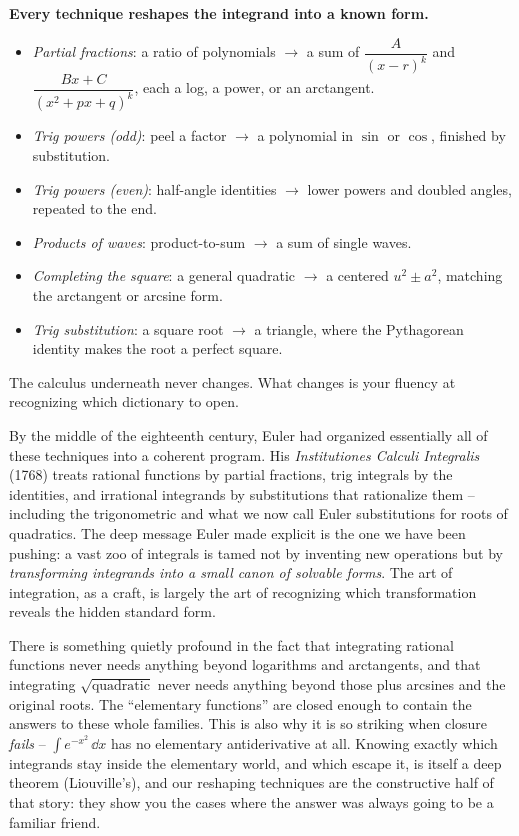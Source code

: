 \begin{focusbox}
\textbf{Every technique reshapes the integrand into a known form.}
\begin{itemize}
\item \emph{Partial fractions}: a ratio of polynomials $\to$ a sum of
   $\dfrac{A}{(x-r)^k}$ and $\dfrac{Bx+C}{(x^2+px+q)^k}$, each a log, a power,
   or an arctangent.
\item \emph{Trig powers (odd)}: peel a factor $\to$ a polynomial in $\sin$ or
   $\cos$, finished by substitution.
\item \emph{Trig powers (even)}: half-angle identities $\to$ lower powers and
   doubled angles, repeated to the end.
\item \emph{Products of waves}: product-to-sum $\to$ a sum of single waves.
\item \emph{Completing the square}: a general quadratic $\to$ a centered
   $u^2 \pm a^2$, matching the arctangent or arcsine form.
\item \emph{Trig substitution}: a square root $\to$ a triangle, where the
   Pythagorean identity makes the root a perfect square.
\end{itemize}
The calculus underneath never changes. What changes is your fluency at
recognizing which dictionary to open.
\end{focusbox}

\begin{historybox}
By the middle of the eighteenth century, Euler had organized essentially all of
these techniques into a coherent program. His \emph{Institutiones Calculi
Integralis} (1768) treats rational functions by partial fractions, trig
integrals by the identities, and irrational integrands by substitutions that
rationalize them -- including the trigonometric and what we now call Euler
substitutions for roots of quadratics. The deep message Euler made explicit is
the one we have been pushing: a vast zoo of integrals is tamed not by inventing
new operations but by \emph{transforming integrands into a small canon of
solvable forms}. The art of integration, as a craft, is largely the art of
recognizing which transformation reveals the hidden standard form.
\end{historybox}

\begin{aestheticbox}
There is something quietly profound in the fact that integrating rational
functions never needs anything beyond logarithms and arctangents, and that
integrating $\sqrt{\text{quadratic}}$ never needs anything beyond those plus
arcsines and the original roots. The ``elementary functions'' are closed enough
to contain the answers to these whole families. This is also why it is so
striking when closure \emph{fails} -- $\int e^{-x^2}\,\dd x$ has no elementary
antiderivative at all. Knowing exactly which integrands stay inside the
elementary world, and which escape it, is itself a deep theorem (Liouville's),
and our reshaping techniques are the constructive half of that story: they show
you the cases where the answer was always going to be a familiar friend.
\end{aestheticbox}

